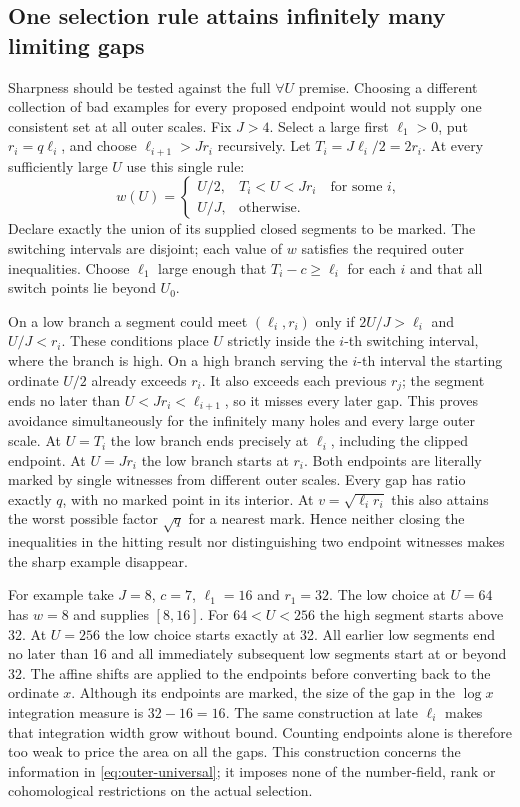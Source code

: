 \documentclass[12pt,letterpaper]{article}
\begin{document}
\subsection{One selection rule attains infinitely many limiting gaps}
Sharpness should be tested against the full \(\forall U\) premise. Choosing a different collection of bad examples for every proposed endpoint would not supply one consistent set at all outer scales. Fix \(J>4\). Select a large first \(\ell_1>0\), put \(r_i=q\ell_i\), and choose
\(\ell_{i+1}>Jr_i\) recursively. Let \(T_i=J\ell_i/2=2r_i\). At every sufficiently large \(U\) use this single rule:
\[
 w(U)=
 \begin{cases}
 U/2,& T_i<U<Jr_i\quad\text{for some }i,\\
 U/J,&\text{otherwise}.
 \end{cases}
\]
Declare exactly the union of its supplied closed segments to be marked. The switching intervals are disjoint; each value of \(w\) satisfies the required outer inequalities. Choose \(\ell_1\) large enough that \(T_i-c\ge\ell_i\) for each \(i\) and that all switch points lie beyond \(U_0\).

On a low branch a segment could meet \((\ell_i,r_i)\) only if \(2U/J>\ell_i\) and \(U/J<r_i\). These conditions place \(U\) strictly inside the \(i\)-th switching interval, where the branch is high. On a high branch serving the \(i\)-th interval the starting ordinate \(U/2\) already exceeds \(r_i\). It also exceeds each previous \(r_j\); the segment ends no later than \(U<Jr_i<\ell_{i+1}\), so it misses every later gap. This proves avoidance simultaneously for the infinitely many holes and every large outer scale. At \(U=T_i\) the low branch ends precisely at \(\ell_i\), including the clipped endpoint. At \(U=Jr_i\) the low branch starts at \(r_i\). Both endpoints are literally marked by single witnesses from different outer scales. Every gap has ratio exactly \(q\), with no marked point in its interior. At \(v=\sqrt{\ell_i r_i}\) this also attains the worst possible factor \(\sqrt q\) for a nearest mark. Hence neither closing the inequalities in the hitting result nor distinguishing two endpoint witnesses makes the sharp example disappear.

For example take \(J=8\), \(c=7\), \(\ell_1=16\) and \(r_1=32\). The low choice at \(U=64\) has \(w=8\) and supplies \([8,16]\). For \(64<U<256\) the high segment starts above 32. At \(U=256\) the low choice starts exactly at 32. All earlier low segments end no later than 16 and all immediately subsequent low segments start at or beyond 32. The affine shifts are applied to the endpoints before converting back to the ordinate \(x\). Although its endpoints are marked, the size of the gap in the \(\log x\) integration measure is \(32-16=16\). The same construction at late \(\ell_i\) makes that integration width grow without bound. Counting endpoints alone is therefore too weak to price the area on all the gaps. This construction concerns the information in \eqref{eq:outer-universal}; it imposes none of the number-field, rank or cohomological restrictions on the actual selection.
\end{document}
